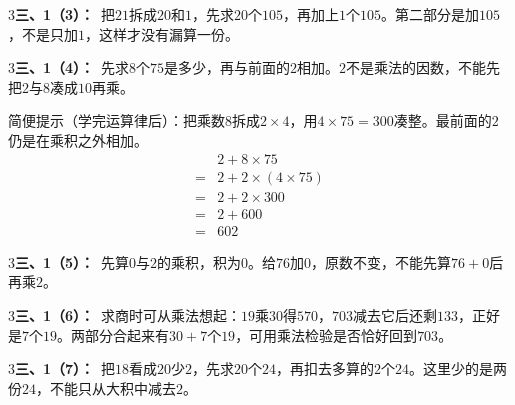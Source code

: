 \documentclass[multi=snippet,border={5bp 20bp 5bp 5bp}]{standalone}
\newenvironment{snippet}[3]{\begin{minipage}{#1bp}\color{answerred}\fontsize{#2}{#3}\selectfont\raggedright}{\end{minipage}}
\begin{document}
\begin{snippet}{505}{11.5}{14}\begin{multicols}{3}\raggedcolumns \textbf{三、1（3）：}\ 把\(21\)\allowbreak 拆成\(20\)\allowbreak 和\(1\)\allowbreak ，先求\(20\)\allowbreak 个\(105\)\allowbreak ，再加上\(1\)\allowbreak 个\(105\)\allowbreak 。第二部分是加\(105\)\allowbreak ，不是只加\(1\)\allowbreak ，这样才没有漏算一份。\end{multicols}\end{snippet}
\begin{snippet}{505}{11.5}{14}\begin{multicols}{3}\raggedcolumns \textbf{三、1（4）：}\ 先求\(8\)\allowbreak 个\(75\)\allowbreak 是多少，再与前面的\(2\)\allowbreak 相加。\(2\)\allowbreak 不是乘法的因数，不能先把\(2\)\allowbreak 与\(8\)\allowbreak 凑成\(10\)\allowbreak 再乘。\par 简便提示（学完运算律后）：把乘数\(8\)\allowbreak 拆成\(2\times4\)\allowbreak ，用\(4\times75=300\)\allowbreak 凑整。最前面的\(2\)\allowbreak 仍是在乘积之外相加。\[\begin{aligned}&2+8\times75\\={}&2+2\times(4\times75)\\={}&2+2\times300\\={}&2+600\\={}&602\end{aligned}\]\end{multicols}\end{snippet}
\begin{snippet}{505}{11.5}{14}\begin{multicols}{3}\raggedcolumns \textbf{三、1（5）：}\ 先算\(0\)\allowbreak 与\(2\)\allowbreak 的乘积，积为\(0\)\allowbreak 。给\(76\)\allowbreak 加\(0\)\allowbreak ，原数不变，不能先算\(76+0\)\allowbreak 后再乘\(2\)\allowbreak 。\end{multicols}\end{snippet}
\begin{snippet}{505}{11.5}{14}\begin{multicols}{3}\raggedcolumns \textbf{三、1（6）：}\ 求商时可从乘法想起：\(19\)\allowbreak 乘\(30\)\allowbreak 得\(570\)\allowbreak ，\(703\)\allowbreak 减去它后还剩\(133\)\allowbreak ，正好是\(7\)\allowbreak 个\(19\)\allowbreak 。两部分合起来有\(30+7\)\allowbreak 个\(19\)\allowbreak ，可用乘法检验是否恰好回到\(703\)\allowbreak 。\end{multicols}\end{snippet}
\begin{snippet}{505}{11.5}{14}\begin{multicols}{3}\raggedcolumns \textbf{三、1（7）：}\ 把\(18\)\allowbreak 看成\(20\)\allowbreak 少\(2\)\allowbreak ，先求\(20\)\allowbreak 个\(24\)\allowbreak ，再扣去多算的\(2\)\allowbreak 个\(24\)\allowbreak 。这里少的是两份\(24\)\allowbreak ，不能只从大积中减去\(2\)\allowbreak 。\end{multicols}\end{snippet}
\end{document}
